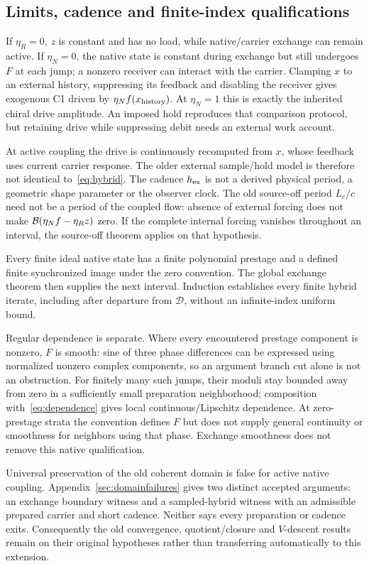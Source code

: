 \subsection{Limits, cadence and finite-index qualifications}\label{sec:limits}
If $\eta_R=0$, $z$ is constant and has no load, while native/carrier exchange can remain active. If $\eta_N=0$, the native state is constant during exchange but still undergoes $F$ at each jump; a nonzero receiver can interact with the carrier. Clamping $x$ to an external history, suppressing its feedback and disabling the receiver gives exogenous C1 driven by $\eta_N f(x_{\rm history})$. At $\eta_N=1$ this is exactly the inherited chiral drive amplitude. An imposed hold reproduces that comparison protocol, but retaining drive while suppressing debit needs an external work account.

At active coupling the drive is continuously recomputed from $x$, whose feedback uses current carrier response. The older external sample/hold model is therefore not identical to~\eqref{eq:hybrid}. The cadence $h_{\rm ex}$ is not a derived physical period, a geometric shape parameter or the observer clock. The old source-off period $L_c/c$ need not be a period of the coupled flow: absence of external forcing does not make $\mathcal B(\eta_Nf-\eta_Rz)$ zero. If the complete internal forcing vanishes throughout an interval, the source-off theorem applies on that hypothesis.~\cite{recirculation}

Every finite ideal native state has a finite polynomial prestage and a defined finite synchronized image under the zero convention. The global exchange theorem then supplies the next interval. Induction establishes every finite hybrid iterate, including after departure from $\mathcal D$, without an infinite-index uniform bound.

Regular dependence is separate. Where every encountered prestage component is nonzero, $F$ is smooth: sine of three phase differences can be expressed using normalized nonzero complex components, so an argument branch cut alone is not an obstruction. For finitely many such jumps, their moduli stay bounded away from zero in a sufficiently small preparation neighborhood; composition with~\eqref{eq:dependence} gives local continuous/Lipschitz dependence. At zero-prestage strata the convention defines $F$ but does not supply general continuity or smoothness for neighbors using that phase. Exchange smoothness does not remove this native qualification.

Universal preservation of the old coherent domain is false for active native coupling. Appendix~\ref{sec:domainfailures} gives two distinct accepted arguments: an exchange boundary witness and a sampled-hybrid witness with an admissible prepared carrier and short cadence. Neither says every preparation or cadence exits. Consequently the old convergence, quotient/closure and $V$-descent results remain on their original hypotheses rather than transferring automatically to this extension.
